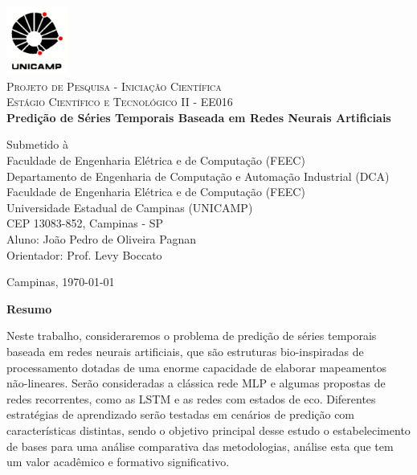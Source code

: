 \documentclass[a4paper, 12pt]{article}
\begin{document}
\begin{titlepage}
\newcommand{\HRule}{\rule{\linewidth}{1.5mm}}
	
\center

\includegraphics[width=0.15\textwidth]{logo-unicamp.pdf}\\[1.0cm]

\textsc{\Large Projeto de Pesquisa - Iniciação Científica}\\[0.5cm]

\textsc{\large Estágio Científico e Tecnológico II - EE016}\\[1.5cm]

{\Large \bfseries Predição de Séries Temporais Baseada em Redes Neurais Artificiais}\\[2.5cm]

\begin{flushleft}
Submetido à \\ Faculdade de Engenharia Elétrica e de Computação (FEEC)\\[1.5cm]

Departamento de Engenharia de Computação e Automação Industrial (DCA)\\
Faculdade de Engenharia Elétrica e de Computação (FEEC)\\
Universidade Estadual de Campinas (UNICAMP)\\
CEP 13083-852, Campinas - SP\\[1.0cm]

Aluno: João Pedro de Oliveira Pagnan\\
Orientador: Prof. Levy Boccato \\[4.5cm]
\end{flushleft}	
	
Campinas, \today

\end{titlepage}

\newpage

{\noindent \Large \textbf{Resumo}}

{\noindent Neste trabalho, consideraremos o problema de predição de séries temporais baseada em redes neurais artificiais, que são estruturas bio-inspiradas de processamento dotadas de uma enorme capacidade de elaborar mapeamentos não-lineares. Serão consideradas a clássica rede MLP e algumas propostas de redes recorrentes, como as LSTM e as redes com estados de eco. Diferentes estratégias de aprendizado serão testadas em cenários de predição com características distintas, sendo o objetivo principal desse estudo o estabelecimento de bases para uma análise comparativa das metodologias, análise esta que tem um valor acadêmico e formativo significativo.}
\end{document}
